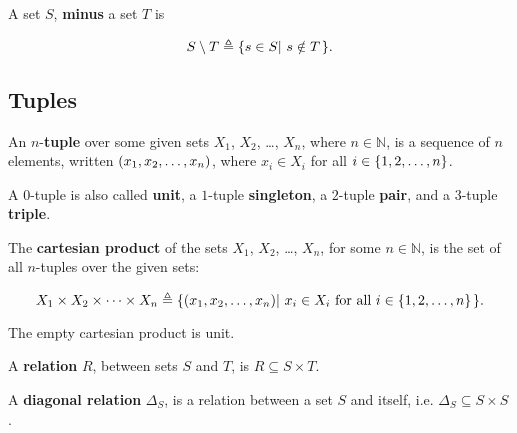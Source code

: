 \begin{definition} A set $S$, \textbf{minus} a set $T$ is

$$S\setminus T \triangleq \mathopen{}\left\{{s\in S\mathopen{}\left|\ {s\notin T}\right.\mathclose{}}\right\}\mathclose{}.$$

\end{definition}

\subsection{Tuples}

\begin{definition} An $n$-\textbf{tuple} over some given sets $X_1$, $X_2$,
\ldots, $X_n$, where $n\in\mathbb{N}$, is a sequence of $n$ elements, written
$\mathopen{}\left({x_1,x_2,\ldots,x_n}\right)\mathclose{}$, where $x_i\in X_i$ for all $i\in\mathopen{}\left\{{1,2,\ldots, n}\right\}\mathclose{}$.
\end{definition}

\begin{definition} A $0$-tuple is also called \textbf{unit}, a $1$-tuple
\textbf{singleton}, a $2$-tuple \textbf{pair}, and a 3-tuple \textbf{triple}.
\end{definition}

\begin{definition} The \textbf{cartesian product} of the sets $X_1$, $X_2$,
\ldots, $X_n$, for some $n\in\mathbb{N}$, is the set of all $n$-tuples over the
given sets:

$$X_1\times X_2\times \cdots \times X_n \triangleq
\mathopen{}\left\{{\mathopen{}\left({x_1,x_2,\ldots,x_n}\right)\mathclose{}\mathopen{}\left|\ { \text{$x_i\in X_i$ for all
$i\in\mathopen{}\left\{{1,2,\ldots, n}\right\}\mathclose{}$}}\right.\mathclose{}}\right\}\mathclose{}.$$

\end{definition}

\begin{remark} The empty cartesian product is unit. \end{remark} 


\begin{definition} A \textbf{relation} $R$, between sets $S$ and $T$, is $R
\subseteq S\times T$. \end{definition}

\begin{definition} A \textbf{diagonal relation} $\Delta_S$, is a relation
between a set $S$ and itself, i.e. $\Delta_S \subseteq S \times S$.
\end{definition}

